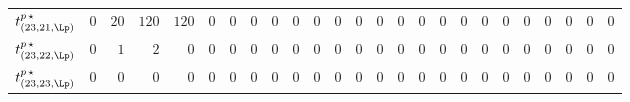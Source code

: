 \begin{tabular}{r|rrrrrrrrrrrrrrrrrrrrrrrr}
  $t^{p \, \star}_{(23,21,\Lp)}$ & $0$ & $20$ & $120$ & $120$ & $0$ & $0$ & $0$ & $0$ & $0$ & $0$ & $0$ & $0$ & $0$ & $0$ & $0$ & $0$ & $0$ & $0$ & $0$ & $0$ & $0$ & $0$ & $0$ & $0$ \\
  $t^{p \, \star}_{(23,22,\Lp)}$ & $0$ & $1$ & $2$ & $0$ & $0$ & $0$ & $0$ & $0$ & $0$ & $0$ & $0$ & $0$ & $0$ & $0$ & $0$ & $0$ & $0$ & $0$ & $0$ & $0$ & $0$ & $0$ & $0$ & $0$ \\
  $t^{p \, \star}_{(23,23,\Lp)}$ & $0$ & $0$ & $0$ & $0$ & $0$ & $0$ & $0$ & $0$ & $0$ & $0$ & $0$ & $0$ & $0$ & $0$ & $0$ & $0$ & $0$ & $0$ & $0$ & $0$ & $0$ & $0$ & $0$ & $0$ \\
\end{tabular}
